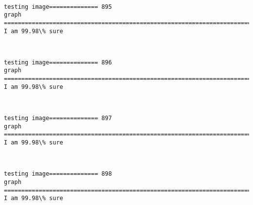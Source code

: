 \documentclass[11pt]{article}
\begin{document}
    \begin{center}
    \end{center}
    { \hspace*{\fill} \\}
    
    \begin{Verbatim}[commandchars=\\\{\}]
testing image============== 895
graph
============================================================================
I am 99.98\% sure

    \end{Verbatim}

    \begin{center}
    \end{center}
    { \hspace*{\fill} \\}
    
    \begin{Verbatim}[commandchars=\\\{\}]
testing image============== 896
graph
============================================================================
I am 99.98\% sure

    \end{Verbatim}

    \begin{center}
    \end{center}
    { \hspace*{\fill} \\}
    
    \begin{Verbatim}[commandchars=\\\{\}]
testing image============== 897
graph
============================================================================
I am 99.98\% sure

    \end{Verbatim}

    \begin{center}
    \end{center}
    { \hspace*{\fill} \\}
    
    \begin{Verbatim}[commandchars=\\\{\}]
testing image============== 898
graph
============================================================================
I am 99.98\% sure

    \end{Verbatim}
\end{document}
